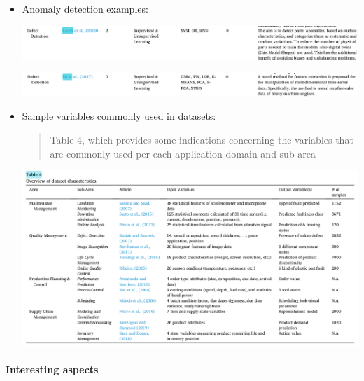 \documentclass[
  letterpaper,
  DIV=11,
  numbers=noendperiod]{scrartcl}
\let\oldparagraph\paragraph
\renewcommand{\paragraph}[1]{\oldparagraph{#1}\mbox{}}
\begin{document}
\begin{itemize}
\item
  Anomaly detection examples:

  \includegraphics{img/2023-01-07-12-48-20.png}

  \includegraphics{img/2023-01-07-12-49-39.png}
\item
  Sample variables commonly used in datasets:

  \begin{quote}
  Table 4, which provides some indications concerning the variables that
  are commonly used per each application domain and sub-area
  \end{quote}

  \includegraphics{img/2023-01-07-12-53-08.png}
\end{itemize}

\hypertarget{interesting-aspects}{%
\paragraph{Interesting aspects}\label{interesting-aspects}}
\end{document}
